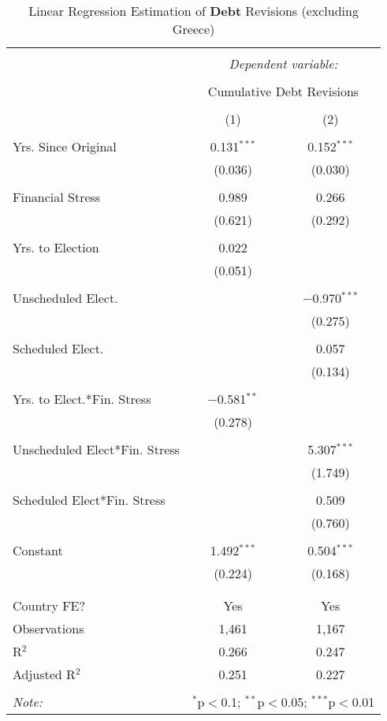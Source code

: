 
\begin{table}[!htbp] \centering 
  \caption{Linear Regression Estimation of \textbf{Debt} Revisions (excluding Greece)} 
  \label{debt_no_greece_results} 
\small 
\begin{tabular}{@{\extracolsep{5pt}}lcc} 
\\[-1.8ex]\hline 
\hline \\[-1.8ex] 
 & \multicolumn{2}{c}{\textit{Dependent variable:}} \\ 
\cline{2-3} 
\\[-1.8ex] & \multicolumn{2}{c}{Cumulative Debt Revisions} \\ 
\\[-1.8ex] & (1) & (2)\\ 
\hline \\[-1.8ex] 
 Yrs. Since Original & 0.131$^{***}$ & 0.152$^{***}$ \\ 
  & (0.036) & (0.030) \\ 
  & & \\ 
 Financial Stress & 0.989 & 0.266 \\ 
  & (0.621) & (0.292) \\ 
  & & \\ 
 Yrs. to Election & 0.022 &  \\ 
  & (0.051) &  \\ 
  & & \\ 
 Unscheduled Elect. &  & $-$0.970$^{***}$ \\ 
  &  & (0.275) \\ 
  & & \\ 
 Scheduled Elect. &  & 0.057 \\ 
  &  & (0.134) \\ 
  & & \\ 
 Yrs. to Elect.*Fin. Stress & $-$0.581$^{**}$ &  \\ 
  & (0.278) &  \\ 
  & & \\ 
 Unscheduled Elect*Fin. Stress &  & 5.307$^{***}$ \\ 
  &  & (1.749) \\ 
  & & \\ 
 Scheduled Elect*Fin. Stress &  & 0.509 \\ 
  &  & (0.760) \\ 
  & & \\ 
 Constant & 1.492$^{***}$ & 0.504$^{***}$ \\ 
  & (0.224) & (0.168) \\ 
  & & \\ 
\hline \\[-1.8ex] 
Country FE? & Yes & Yes \\ 
Observations & 1,461 & 1,167 \\ 
R$^{2}$ & 0.266 & 0.247 \\ 
Adjusted R$^{2}$ & 0.251 & 0.227 \\ 
\hline 
\hline \\[-1.8ex] 
\textit{Note:}  & \multicolumn{2}{r}{$^{*}$p$<$0.1; $^{**}$p$<$0.05; $^{***}$p$<$0.01} \\ 
\end{tabular} 
\end{table} 
